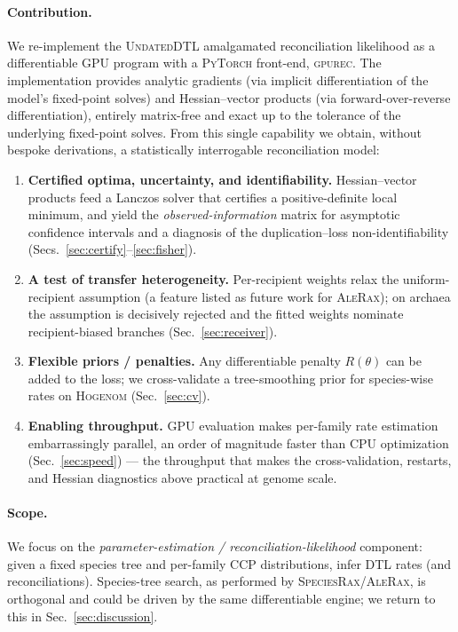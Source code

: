 \documentclass[11pt]{article}
\newcommand{\toolname}{\textsc{gpurec}\xspace}
\begin{document}
\paragraph{Contribution.} We re-implement the \textsc{UndatedDTL} amalgamated
reconciliation likelihood as a differentiable GPU program with a
\textsc{PyTorch} front-end, \toolname. The implementation provides analytic
gradients (via implicit differentiation of the model's fixed-point solves) and
Hessian--vector products (via forward-over-reverse differentiation), entirely
matrix-free and exact up to the tolerance of the underlying fixed-point solves.
From this single capability we obtain, without bespoke derivations, a
statistically interrogable reconciliation model:
\begin{enumerate}[leftmargin=1.4em,itemsep=2pt]
\item \textbf{Certified optima, uncertainty, and identifiability.}
Hessian--vector products feed a Lanczos solver that certifies a positive-definite
local minimum, and yield the \emph{observed-information} matrix for asymptotic
confidence intervals and a diagnosis of the duplication--loss non-identifiability
(Secs.~\ref{sec:certify}--\ref{sec:fisher}).
\item \textbf{A test of transfer heterogeneity.} Per-recipient weights relax the
uniform-recipient assumption (a feature listed as future work for
\textsc{AleRax}); on archaea the assumption is decisively rejected and the fitted
weights nominate recipient-biased branches (Sec.~\ref{sec:receiver}).
\item \textbf{Flexible priors / penalties.} Any differentiable penalty
$R(\theta)$ can be added to the loss; we cross-validate a tree-smoothing prior
for species-wise rates on \textsc{Hogenom} (Sec.~\ref{sec:cv}).
\item \textbf{Enabling throughput.} GPU evaluation makes per-family rate
estimation embarrassingly parallel, an order of magnitude faster than CPU
optimization (Sec.~\ref{sec:speed}) --- the throughput that makes the
cross-validation, restarts, and Hessian diagnostics above practical at genome
scale.
\end{enumerate}

\paragraph{Scope.} We focus on the \emph{parameter-estimation /
reconciliation-likelihood} component: given a fixed species tree and per-family
CCP distributions, infer DTL rates (and reconciliations). Species-tree search,
as performed by \textsc{SpeciesRax}/\textsc{AleRax}, is orthogonal and could be
driven by the same differentiable engine; we return to this in
Sec.~\ref{sec:discussion}.
\end{document}
